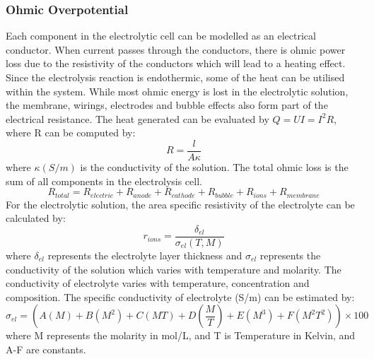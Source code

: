 \documentclass[11pt, a4paper]{article}
\begin{document}
\subsubsection{Ohmic Overpotential} 
Each component in the electrolytic cell can be modelled as an electrical conductor. When current passes through the conductors, there is ohmic power loss due to the resistivity of the conductors which will lead to a heating effect. Since the electrolysis reaction is endothermic, some of the heat can be utilised within the system. While most ohmic energy is lost in the electrolytic solution, the membrane, wirings, electrodes  and bubble effects also form part of the electrical resistance. The heat generated can be evaluated by  $ Q=UI=I^2 R$, where R can be computed by:
 \begin{equation}
R=\frac{l} {A \kappa} 
\end{equation} 
where $ \kappa(S/m) $  is the conductivity of the solution.\newline
The total ohmic loss is the sum of all components in the electrolysis cell.
\begin{equation} 
R_{total}=R_{electric} + R_{anode}+ R_{cathode}+R_{bubble}+R_{ions} +R_{membrane} 
\end{equation} 
For the electrolytic solution, the area specific resistivity of the electrolyte can be calculated by:\cite{conductivity}
\begin{equation} 
r_{ions}=\frac{\delta_{el}} {\sigma_{el}(T,M) } 
\end{equation} 
where $\delta_{el}$ represents the electrolyte layer thickness and $\sigma_{el}$ represents the conductivity of the solution which varies with temperature and molarity.
The conductivity of electrolyte varies with temperature, concentration and composition. The specific conductivity of electrolyte (S/m) can be estimated by:\cite{conductivity}
\begin{equation} 
\sigma_{el} = (A(M) + B(M^2) + C(MT) + D(\frac{M} {T}) + E(M^3) +F(M^2T^2) )\times 100
\label{eq:sig}
\end{equation} 
where M represents the molarity in mol/L, and T is Temperature in Kelvin, and A-F are constants.
\end{document}
